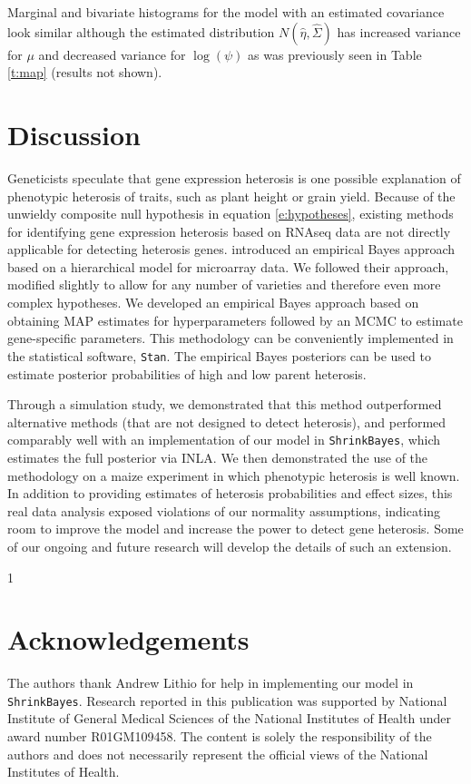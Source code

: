 \documentclass[useAMS,usenatbib,referee]{biom}
\newcommand{\blind}{1} %
\begin{document}
Marginal and bivariate histograms for the model with an estimated covariance look similar although the estimated distribution $N(\hat{\eta},\hat{\Sigma})$ has increased variance for $\mu$ and decreased variance for $\log(\psi)$ as was previously seen in Table \ref{t:map} (results not shown). 

\section{Discussion}
\label{s:discussion}

Geneticists speculate that gene expression heterosis is one possible explanation of phenotypic heterosis of traits, such as plant height or grain yield. Because of the unwieldy composite null hypothesis in equation \eqref{e:hypotheses}, existing methods for identifying gene expression heterosis based on RNAseq data are not directly applicable for detecting heterosis genes. \cite{ji2014estimation} introduced an empirical Bayes approach based on a hierarchical model for microarray data. We followed their approach, modified slightly to allow for any number of varieties and therefore even more complex hypotheses. We developed an empirical Bayes approach based on obtaining MAP estimates for hyperparameters followed by an MCMC to estimate gene-specific parameters. This methodology can be conveniently implemented in the statistical software, {\tt Stan}. The empirical Bayes posteriors can be used to estimate posterior probabilities of high and low parent heterosis. 

Through a simulation study, we demonstrated that this method outperformed alternative methods (that are not designed to detect heterosis), and performed comparably well with an implementation of our model in {\tt ShrinkBayes}, which estimates the full posterior via INLA. We then demonstrated the use of the methodology on a maize experiment in which phenotypic heterosis is well known. 
In addition to providing estimates of heterosis probabilities and effect sizes, this real data analysis exposed violations of our normality assumptions, indicating room to improve the model and increase the power to detect gene heterosis. Some of our ongoing and future research will develop the details of such an extension.




\backmatter %

\blind{
\section*{Acknowledgements}

The authors thank Andrew Lithio for help in implementing our model in {\tt ShrinkBayes}. Research reported in this publication was supported by National Institute of General Medical Sciences of the National Institutes of Health under award number R01GM109458. The content is solely the responsibility of the authors and does not necessarily represent the official views of the National Institutes of Health.
} \fi
\end{document}
